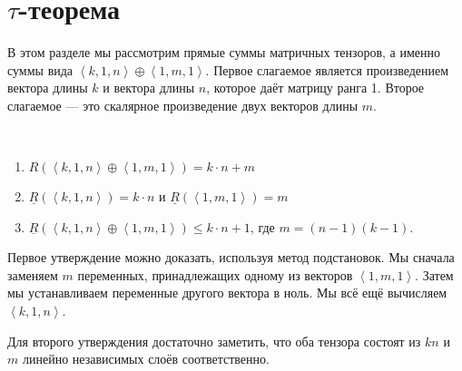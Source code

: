 \section{$\tau$-теорема}

В этом разделе мы рассмотрим прямые суммы матричных тензоров, а именно суммы вида $\left\langle k,1,n \right\rangle \oplus \left\langle 1,m,1 \right\rangle$. Первое слагаемое является произведением вектора длины $k$ и вектора длины $n$, которое даёт матрицу ранга 1. Второе слагаемое --- это скалярное произведение двух векторов длины $m$.

\begin{remark}\label{rem:bi:6.1}\ 
  	\begin{enumerate}
	     \item $R(\left\langle k,1,n \right\rangle \oplus \left\langle 1,m,1 \right\rangle) = k \cdot n + m$
	     \item $\underline{R}(\left\langle k,1,n \right\rangle) = k \cdot n$ и $\underline{R}(\left\langle 1,m,1 \right\rangle) = m$
	     \item $\underline{R}(\left\langle k,1,n \right\rangle \oplus \left\langle 1,m,1 \right\rangle) \leq k \cdot n + 1$, где $m = (n-1)(k-1)$. 
	\end{enumerate}	
\end{remark}

Первое утверждение можно доказать, используя метод подстановок. Мы сначала заменяем $m$ переменных, принадлежащих одному из векторов $\left\langle 1,m,1 \right\rangle$. Затем мы устанавливаем переменные другого вектора в ноль. Мы всё ещё вычисляем $\left\langle k,1,n \right\rangle$.

Для второго утверждения достаточно заметить, что оба тензора состоят из $kn$ и $m$ линейно независимых слоёв соответственно.

